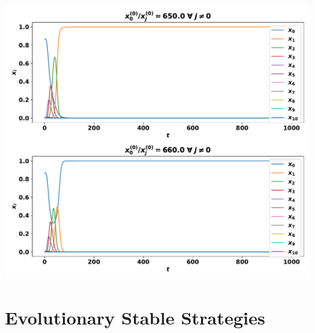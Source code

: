 \documentclass{beamer}              %
\begin{document}
\begin{frame}
    \begin{center}
        \includegraphics[width=.8\textwidth]{./static/two_thirds_of_the_average_game/numerical_solution_of_replicator_dynamics_with_different_starting_populations/main.pdf}
    \end{center}
\end{frame}


\section{Evolutionary Stable Strategies}
\end{document}

